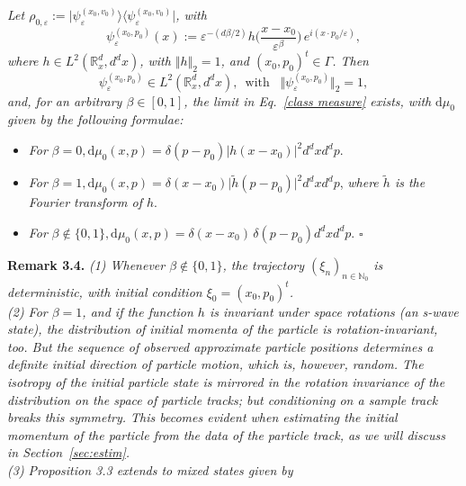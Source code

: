 \documentclass[11pt]{article}
\begin{document}
\vspace{0.2cm} \textit{Let $\rho_{0, \varepsilon}:= \big| \psi_{\varepsilon}^{(x_0, v_0)}\rangle \langle \psi_{\varepsilon}^{(x_0, v_0)}\big|$, with 
\begin{equation}\label{wave function}
\psi_{\varepsilon}^{(x_0,p_0)}(x):= \varepsilon^{-(d\beta/2)} h\Big(\frac{x-x_0}{\varepsilon^{\beta}}\Big) \,
e^{i(x\cdot p_0/\varepsilon)},
\end{equation}
where $h \in L^{2}(\mathbb{R}^{d}_{x}, d^{d}x)$, with $\Vert h \Vert_{2}=1$, and $(x_0, p_0)^{t} \in \Gamma$.
Then 
$$\psi_{\varepsilon}^{(x_0,p_0)} \in L^{2}(\mathbb{R}^{d}_{x}, d^{d}x), \,\text{ with }\,\,\, \Vert \psi_{\varepsilon}^{(x_0,p_0)} \Vert_{2}=1, $$
and, for an arbitrary $\beta \in [0,1]$, the limit in Eq.~\eqref{class measure} exists, with} $\text{d}\mu_0$ \textit{given by the following formulae:}
\begin{itemize}
\item{ \textit{For} $\beta =0, \text{d}\mu_{0}(x,p) = \delta(p-p_0) \vert h(x-x_0) \vert^{2} d^{d}x d^{d}p.$}
\item{\textit{For} $\beta=1, \text{d}\mu_{0}(x,p) = \delta(x-x_0) \vert \widetilde{h}(p-p_0) \vert^{2} d^{d}x d^{d}p$, \textit{where
$\widetilde{h}$ is the Fourier transform of $h$}.}
\item{\textit{For} $\beta \notin \{0,1\},  \text{d}\mu_{0}(x,p) = \delta(x-x_0)\,\delta(p-p_0) d^{d}x d^{d}p$. \hspace{5.8cm}$\square$}
\end{itemize}
\noindent
{\bf{Remark 3.4.}} \textit{(1) Whenever $\beta \notin\{0,1\}$, the trajectory $(\xi_n)_{n\in \mathbb{N}_0}$ is deterministic, with 
initial condition $\xi_0=(x_0, p_0)^{t}$.}\\
\textit{(2) For $\beta=1$, and if the function $h$ is invariant under space rotations (an s-wave state), the distribution of initial momenta of the particle is rotation-invariant, too. But the sequence of observed approximate 
particle positions determines a definite initial direction of particle motion, which is, however, random. 
The isotropy of the initial particle state is mirrored in the rotation invariance of the \textit{distribution} on the space 
of particle tracks; but conditioning on a sample track breaks this symmetry. This becomes evident when 
estimating the initial momentum of the particle from the data of the particle track, as we will 
discuss in Section~\ref{sec:estim}.}\\
\textit{(3) Proposition 3.3 extends to mixed states given by}
\end{document}
